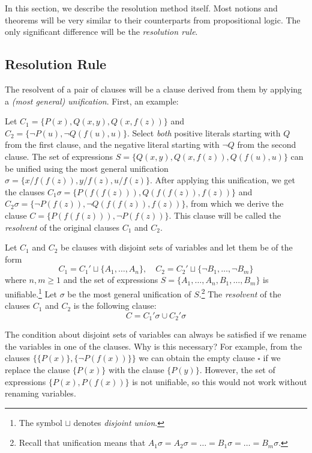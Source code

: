 In this section, we describe the resolution method itself. Most notions and theorems will be very similar to their counterparts from propositional logic. The only significant difference will be the \emph{resolution rule}.

\subsection{Resolution Rule}

The resolvent of a pair of clauses will be a clause derived from them by applying a \emph{(most general) unification}. First, an example:

\begin{example}
Let $C_1=\{P(x),Q(x,y),Q(x,f(z))\}$ and $C_2=\{\neg P(u),\neg Q(f(u),u)\}$. Select \emph{both} positive literals starting with $Q$ from the first clause, and the negative literal starting with $\neg Q$ from the second clause. The set of expressions $S=\{Q(x,y),Q(x,f(z)),Q(f(u),u)\}$ can be unified using the most general unification $\sigma=\{x/f(f(z)),y/f(z),u/f(z)\}$. After applying this unification, we get the clauses $C_1\sigma=\{P(f(f(z))),Q(f(f(z)),f(z))\}$ and $C_2\sigma=\{\neg P(f(z)),\neg Q(f(f(z)),f(z))\}$, from which we derive the clause $C=\{P(f(f(z))),\neg P(f(z))\}$. This clause will be called the \emph{resolvent} of the original clauses $C_1$ and $C_2$.
\end{example}

\begin{definition}
    Let $C_1$ and $C_2$ be clauses with disjoint sets of variables and let them be of the form
    $$
    C_1=C_1'\sqcup \{A_1,\dots,A_n\},\quad C_2=C_2'\sqcup \{\neg B_1,\dots,\neg B_m\}
    $$
    where $n,m\ge 1$ and the set of expressions $S=\{A_1,\dots,A_n,B_1,\dots,B_m\}$ is unifiable.\footnote{The symbol $\sqcup$ denotes \emph{disjoint union}.} Let $\sigma$ be the most general unification of $S$.\footnote{Recall that unification means that $A_1\sigma=A_2\sigma=\dots=B_1\sigma=\dots=B_m\sigma$.} The \emph{resolvent} of the clauses $C_1$ and $C_2$ is the following clause:
    $$
    C=C_1'\sigma \cup C_2'\sigma
    $$
\end{definition}

\begin{remark}\label{remark:resolution-step-rename}
    The condition about disjoint sets of variables can always be satisfied if we rename the variables in one of the clauses. Why is this necessary? For example, from the clauses $\{\{P(x)\},\{\neg P(f(x))\}\}$ we can obtain the empty clause $\square$ if we replace the clause $\{P(x)\}$ with the clause $\{P(y)\}$. However, the set of expressions $\{P(x),P(f(x))\}$ is not unifiable, so this would not work without renaming variables.
\end{remark}

